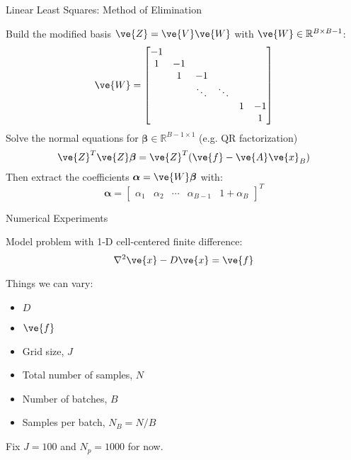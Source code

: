 \documentclass{beamer}
\begin{document}
\begin{frame}{Linear Least Squares: Method of Elimination}

  Build the modified basis $\ve{Z} = \ve{V}\ve{W}$ with $\ve{W} \in
  \mathbb{R}^{B \times B-1}$:
  \[
  \ve{W} =
  \begin{bmatrix}
    -1 &    & & & & \\
     1 & -1 & & & & \\
       &  1 & -1 & & & \\
       &    & \ddots   & \ddots &  & \\
     & & & & 1 & -1 \\
    & & & & & 1 \\
  \end{bmatrix}
  \]
  Solve the normal equations for $\boldsymbol{\beta} \in
  \mathbb{R}^{B-1 \times 1}$ (e.g. QR factorization)
  \[
  \ve{Z}^T \ve{Z} \boldsymbol{\beta} = \ve{Z}^T ( \ve{f} - \ve{A}\ve{x}_B
  )
  \]
  Then extract the coefficients $\boldsymbol{\alpha} =
  \ve{W}\boldsymbol{\beta}$ with:
  \[
  \boldsymbol{\alpha} =
  \begin{bmatrix}
    \alpha_1 & \alpha_2 & \cdots & \alpha_{B-1} & 1 + \alpha_{B}
  \end{bmatrix}^T
  \]

\end{frame}

\begin{frame}{Numerical Experiments}

  Model problem with 1-D cell-centered finite difference:
  \[
  \nabla^2 \ve{x} - D \ve{x} = \ve{f}
  \]

  Things we can vary:
  \begin{itemize}
    \item $D$
    \item $\ve{f}$
    \item Grid size, $J$
    \item Total number of samples, $N$
    \item Number of batches, $B$
    \item Samples per batch, $N_B = N/B$
  \end{itemize}
  
  \bigskip

  Fix $J=100$ and $N_p=1000$ for now.

\end{frame}
\end{document}
